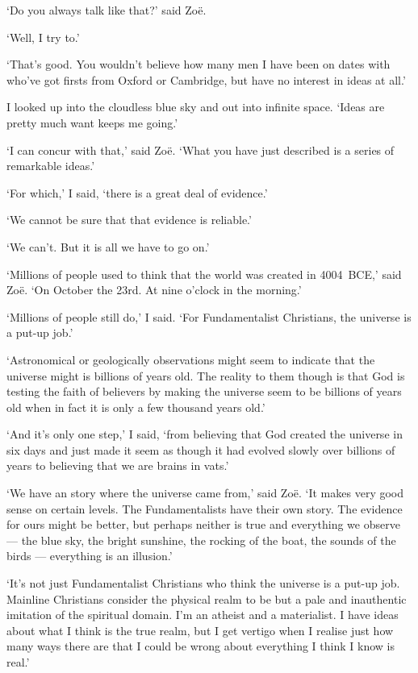 `Do you always talk like that?' said Zoë.

`Well, I try to.'

`That's good. You wouldn't believe how many men I have been on dates
with who've got firsts from Oxford or Cambridge, but have no
interest in ideas at all.'

I looked up into the cloudless blue sky and out into infinite space.
`Ideas are pretty much want keeps me going.'

`I can concur with that,' said Zoë. `What you have just
described is a series of remarkable ideas.'

`For which,' I said, `there is a great deal of evidence.'

`We cannot be sure that that evidence is reliable.'

`We can't. But it is all we have to go on.'

`Millions of people used to think that the world was created in
4004~BCE,' said Zoë. `On October the 23rd. At nine o'clock in
the morning.'

`Millions of people still do,' I said. `For Fundamentalist
Christians, the universe {\twelveit is\/} a put-up job.'

`Astronomical or geologically observations might seem to indicate
that the universe might is billions of years old. The reality to
them though is that God is testing the faith of believers by making
the universe seem to be billions of years old when in fact it is
only a few thousand years old.'

`And it's only one step,' I said, `from believing that God created
the universe in six days and just made it seem as though it had
evolved slowly over billions of years to believing that we are
brains in vats.'

`We have an story where the universe came from,' said Zoë. `It
makes very good sense on certain levels. The Fundamentalists have
their own story. The evidence for ours might be better, but perhaps
neither is true and everything we observe --- the blue sky, the
bright sunshine, the rocking of the boat, the sounds of the birds
--- everything is an illusion.'

`It's not just Fundamentalist Christians who think the universe is a
put-up job. Mainline Christians consider the physical realm to be
but a pale and inauthentic imitation of the spiritual domain. I'm an
atheist and a materialist. I have ideas about what I think is the
true realm, but I get vertigo when I realise just how many ways
there are that I could be wrong about everything I think I know is
real.'

